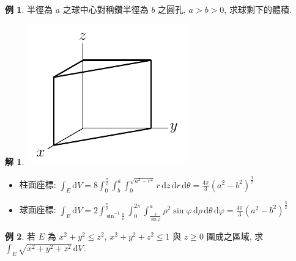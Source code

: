 \documentclass[12pt]{extarticle}
\newcommand{\ds}{\displaystyle}
\theoremstyle{definition}
\newtheorem*{ex}{例}
\newtheorem*{sol}{解}
\begin{document}
\begin{ex}
  半徑為 $a$ 之球中心對稱鑽半徑為 $b$ 之圓孔, $a > b > 0$, 求球剩下的體積.
\end{ex}

\begin{sol}
  \begin{minipage}{0.25\textwidth}
    \includegraphics[scale=0.62,page=17]{fig/text.pdf} 
  \end{minipage}
  \begin{minipage}{0.75\textwidth}
    \begin{itemize}
      \item 柱面座標: $\ds\int_E\text{d}V = 8\int_0^{\frac{\pi}{2}}\!\!\int_b^a\!\int_0^{\sqrt{a^2 - r^2}}\!r\,\text{d}z\,\text{d}r\,\text{d}\theta = \frac{4\pi}{3}(a^2 - b^2)^{\frac{3}{2}}$ 
      \item 球面座標: $\ds\int_E\text{d}V = 2\int_{\sin^{-1}\!\!\frac{b}{a}}^{\frac{\pi}{2}}\!\int_0^{2\pi}\!\!\!\int_{\frac{b}{\sin\varphi}}^{a}\rho^2\sin\varphi\,\text{d}\rho\,\text{d}\theta\,\text{d}\varphi = \frac{4\pi}{3}(a^2 - b^2)^{\frac{3}{2}}$
    \end{itemize}
  \end{minipage}
\end{sol}

\begin{ex}
  若 $E$ 為 $x^2 + y^2 \leqslant z^2$, $x^2 + y^2 + z^2 \leqslant 1$ 與 $z\geqslant 0$ 圍成之區域, 求 $\ds\int_E \sqrt{x^2 + y^2 + z^2}\,\text{d}V$.
\end{ex}
\end{document}
